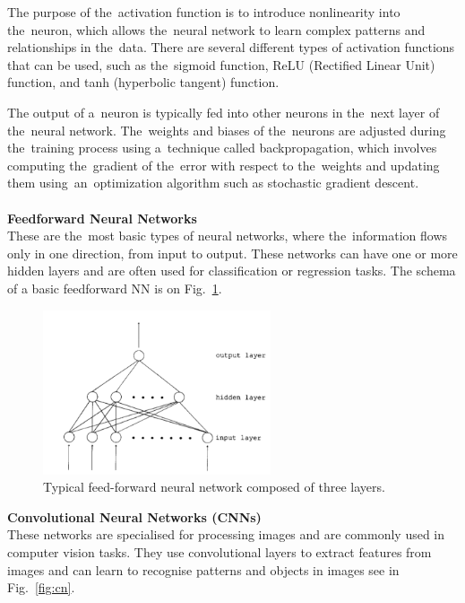     The purpose of the~activation function is to introduce nonlinearity into the~neuron, which allows the~neural network to learn complex patterns and relationships in the~data. There are several different types of activation functions that can be used, such as the~sigmoid function, ReLU (Rectified Linear Unit) function, and tanh (hyperbolic tangent) function.
    
    The output of a~neuron is typically fed into other neurons in the~next layer of the~neural network. The~weights and biases of the~neurons are adjusted during the~training process using a~technique called backpropagation, which involves computing the~gradient of the~error with respect to the~weights and updating them using~an~optimization algorithm such as stochastic gradient descent.\\
    \\
    \textbf{Feedforward Neural Networks}\\
    These are the~most basic types of neural networks, where the~information flows only in one direction, from input to output. These networks can have one or more hidden layers and are often used for classification or regression tasks. The schema of a basic feedforward NN is on Fig.~\ref{fig:ff}.
    \begin{center}
        \begin{figure}[]
            \centering
            \includegraphics[width=0.6\textwidth]{figures/ff}
            \caption{Typical feed-forward neural network composed of three layers. \cite{svozil1997quantum}}
            \label{fig:ff}
        \end{figure}
    \end{center}
    \textbf{Convolutional Neural Networks (CNNs)}\\
    These networks are specialised for processing images and are commonly used in computer vision tasks. They use convolutional layers to extract features from images and can learn to recognise patterns and objects in images see in Fig.~\ref{fig:cn}.
